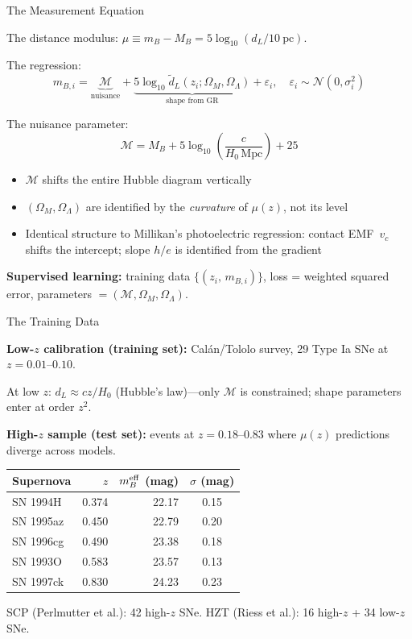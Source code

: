 \documentclass[aspectratio=169]{beamer}
\begin{document}
\begin{frame}{The Measurement Equation}

The distance modulus: $\mu \equiv m_B - M_B =
5\log_{10}(d_L/10~\text{pc})$.

\medskip
The regression:
\[
  \boxed{m_{B,i} = \underbrace{\mathcal{M}}_{\text{nuisance}}
    + \underbrace{5\log_{10}\tilde d_L(z_i;\Omega_M,\Omega_\Lambda)}_{\text{shape from GR}}
    + \varepsilon_i,
    \quad \varepsilon_i \sim \mathcal{N}(0,\sigma_i^2)}
\]

\medskip
The nuisance parameter:
\[
  \mathcal{M} = M_B + 5\log_{10}\!\left(\frac{c}{H_0\,\text{Mpc}}\right) + 25
\]

\begin{itemize}
  \item $\mathcal{M}$ shifts the entire Hubble diagram vertically
  \item $(\Omega_M, \Omega_\Lambda)$ are identified by the
    \emph{curvature} of $\mu(z)$, not its level
  \item Identical structure to Millikan's photoelectric regression:
    contact EMF~$v_c$ shifts the intercept; slope $h/e$ is
    identified from the gradient
\end{itemize}

\medskip
\textbf{Supervised learning:}\quad
training data $\{(z_i,\, m_{B,i})\}$,\quad
loss = weighted squared error,\quad
parameters $= (\mathcal{M}, \Omega_M, \Omega_\Lambda)$.

\end{frame}

\begin{frame}{The Training Data}

\textbf{Low-$z$ calibration (training set):}
Cal\'an/Tololo survey, 29 Type Ia SNe at $z = 0.01$--$0.10$.

\medskip
At low $z$: $d_L \approx cz/H_0$ (Hubble's law)---only $\mathcal{M}$
is constrained; shape parameters enter at order $z^2$.

\bigskip
\textbf{High-$z$ sample (test set):} events at $z = 0.18$--$0.83$
where $\mu(z)$ predictions diverge across models.

\medskip
\begin{center}
\small
\begin{tabular}{lrrc}
\toprule
Supernova & $z$ & $m_B^{\rm eff}$ (mag) & $\sigma$ (mag) \\
\midrule
SN 1994H  & 0.374 & 22.17 & 0.15 \\
SN 1995az & 0.450 & 22.79 & 0.20 \\
SN 1996cg & 0.490 & 23.38 & 0.18 \\
SN 1993O  & 0.583 & 23.57 & 0.13 \\
SN 1997ck & 0.830 & 24.23 & 0.23 \\
\bottomrule
\end{tabular}
\end{center}

\medskip
SCP (Perlmutter et al.): 42 high-$z$ SNe.\quad
HZT (Riess et al.): 16 high-$z$ + 34 low-$z$ SNe.

\end{frame}
\end{document}
